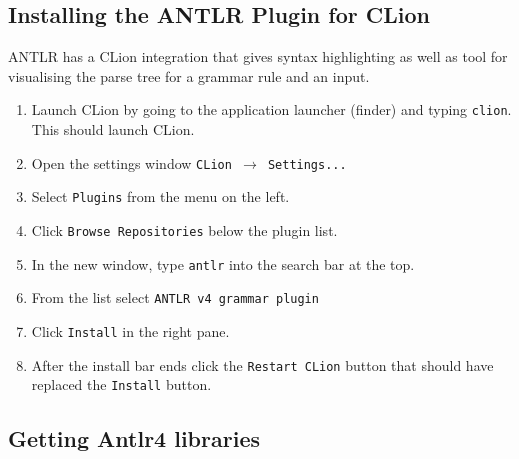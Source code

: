 \documentclass[../setup.tex]{subfiles}
\begin{document}
\subsection{Installing the ANTLR Plugin for CLion}
ANTLR has a CLion integration that gives syntax highlighting as well as tool for visualising the
parse tree for a grammar rule and an input.
\begin{enumerate}
  \item
    Launch CLion by going to the application launcher (finder) and typing \lstinline{clion}. This
    should launch CLion.
  \item
    Open the settings window \texttt{CLion $\rightarrow$ Settings...}
  \item
    Select \texttt{Plugins} from the menu on the left.
  \item
    Click \texttt{Browse Repositories} below the plugin list.
  \item
    In the new window, type \texttt{antlr} into the search bar at the top.
  \item
    From the list select \lstinline{ANTLR v4 grammar plugin}
  \item
    Click \texttt{Install} in the right pane.
  \item
    After the install bar ends click the \texttt{Restart CLion} button that should have replaced
    the \texttt{Install} button.
\end{enumerate}

  \subsection{Getting Antlr4 libraries}
\end{document}
